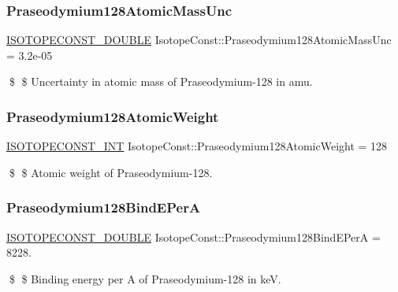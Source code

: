 \subsubsection{\texorpdfstring{Praseodymium128\+Atomic\+Mass\+Unc}{Praseodymium128AtomicMassUnc}}
{\footnotesize\ttfamily \mbox{\hyperlink{group___isotope_const-_macros_ga8f45a7272ce02c0b4c65c44636ed719a}{I\+S\+O\+T\+O\+P\+E\+C\+O\+N\+S\+T\+\_\+\+D\+O\+U\+B\+LE}} Isotope\+Const\+::\+Praseodymium128\+Atomic\+Mass\+Unc = 3.\+2e-\/05}

\$ \$ Uncertainty in atomic mass of Praseodymium-\/128 in amu. \mbox{\label{group___isotope_const-_praseodymium-_pr128_ga7e21f214ab2f074c2078592f150a8e0f}} 
\subsubsection{\texorpdfstring{Praseodymium128\+Atomic\+Weight}{Praseodymium128AtomicWeight}}
{\footnotesize\ttfamily \mbox{\hyperlink{group___isotope_const-_macros_ga5f18360b3e99483a35c32d789e62621c}{I\+S\+O\+T\+O\+P\+E\+C\+O\+N\+S\+T\+\_\+\+I\+NT}} Isotope\+Const\+::\+Praseodymium128\+Atomic\+Weight = 128}

\$ \$ Atomic weight of Praseodymium-\/128. \mbox{\label{group___isotope_const-_praseodymium-_pr128_gab166934d0f7ad83a76808f8c7c1398b1}} 
\subsubsection{\texorpdfstring{Praseodymium128\+Bind\+E\+PerA}{Praseodymium128BindEPerA}}
{\footnotesize\ttfamily \mbox{\hyperlink{group___isotope_const-_macros_ga8f45a7272ce02c0b4c65c44636ed719a}{I\+S\+O\+T\+O\+P\+E\+C\+O\+N\+S\+T\+\_\+\+D\+O\+U\+B\+LE}} Isotope\+Const\+::\+Praseodymium128\+Bind\+E\+PerA = 8228.}

\$ \$ Binding energy per A of Praseodymium-\/128 in keV. \mbox{\label{group___isotope_const-_praseodymium-_pr128_gacf12f58bad084e744debe2d2458718be}} 
